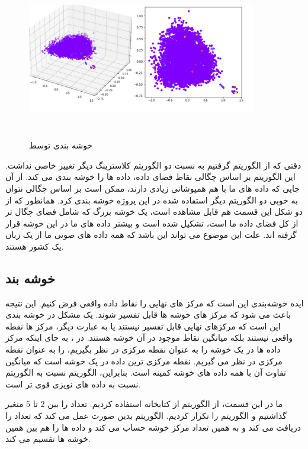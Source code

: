 \documentclass[12pt,onecolumn,a4paper]{article}
\begin{document}
\begin{figure}
  \centering
  \includegraphics[width=10cm,height=7cm,keepaspectratio]{20.png}
  \caption{خوشه بندی توسط }
  \label{fig:DBSCAN}
\end{figure}

دقتی که از الگوریتم  گرفتیم به نسبت دو الگوریتم کلاسترینگ دیگر تغییر خاصی نداشت. این الگوریتم بر اساس چگالی نقاط فضای داده، داده ها را خوشه بندی می کند. از آن جایی که داده های ما با هم همپوشانی زیادی دارند، ممکن است بر اساس چگالی نتوان به خوبی دو الگوریتم دیگر استفاده شده در این پروژه خوشه بندی کرد. همانطور که از دو شکل این قسمت هم قابل مشاهده است، یک خوشه بزرگ که شامل فضای چگال تر از کل فضای داده ما است، تشکیل شده است و بیشتر داده های ما در این خوشه قرار گرفته اند. علت این موضوع می تواند این باشد که همه داده های صوتی ما از یک زبان یک کشور هستند.

\subsection{خوشه بند }

ایده خوشه‌بندی  این است که مرکز های نهایی را نقاط داده واقعی فرض کنیم. این نتیجه باعث می شود که مرکز های خوشه ها قابل تفسیر شوند. یک مشکل در خوشه بندی  این است که مرکزهای نهایی قابل تفسیر نیستند یا به عبارت دیگر، مرکز ها نقطه واقعی نیستند بلکه میانگین نقاط موجود در آن خوشه هستند. در ، به جای اینکه مرکز داده ها در یک خوشه را به عنوان نقطه مرکزی در نظر بگیریم،  را به عنوان نقطه مرکزی در نظر می گیریم. نقطه  مرکزی ترین داده در یک خوشه است که میانگین تفاوت آن با همه داده های خوشه کمینه است. بنابراین، الگوریتم  نسبت به الگوریتم  نسبت به داده های نویزی قوی تر است.

ما در این قسمت، از الگوریتم  از کتابخانه  استفاده کردیم.
تعداد  را بین 2 تا 5 متغیر گذاشتیم و الگوریتم را تکرار کردیم. الگوریتم بدین صورت عمل می کند که تعداد  را دریافت می کند و به همین تعداد مرکز خوشه حساب می کند و داده ها را هم بین همین خوشه ها تقسیم می کند.
\end{document}
